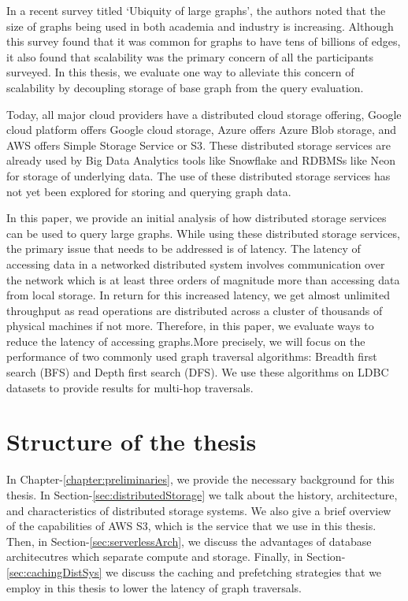 In a recent survey titled `Ubiquity of large graphs'\cite{sahu2017ubiquity}, the
authors noted that the size of graphs being used in both academia and industry
is increasing. Although this survey found that it was common for graphs to have
tens of billions of edges, it also found that scalability was the primary
concern of all the participants surveyed\cite{sahu2017ubiquity}. In this thesis,
we evaluate one way to alleviate this concern of scalability by decoupling
storage of base graph from the query evaluation.

\medskip
Today, all major cloud providers have a distributed cloud storage offering,
Google cloud platform offers Google cloud storage\cite{gcpStorage}, Azure offers
Azure Blob storage\cite{azureStorage}, and AWS offers Simple Storage Service or 
S3\cite{awsS3}. These distributed storage services are already used by Big Data
Analytics tools like Snowflake\cite{snowflake} and RDBMSs like Neon\cite{neonPostgres} 
for storage of underlying data. The use of these distributed storage services has not
yet been explored for storing and querying graph data.

\medskip
In this paper, we provide an initial analysis of how distributed storage services can 
be used to query large graphs. While using these distributed storage services, the primary
issue that needs to be addressed is of latency. The latency of accessing data in a networked
distributed system involves communication over the network which is at least three orders of
magnitude more than accessing data from local storage. In return for this increased latency,
we get almost unlimited throughput as read operations are distributed across a cluster 
of thousands of physical machines if not more. Therefore, in this paper, we evaluate ways to
reduce the latency of accessing graphs.More precisely, we will focus on the 
performance of two commonly used graph traversal algorithms: Breadth first search 
(BFS) and Depth first search (DFS). We use these algorithms on LDBC datasets
to provide results for multi-hop traversals. 

\section{Structure of the thesis}

\medskip
In Chapter-\ref{chapter:preliminaries}, we provide the necessary background for
this thesis. In Section-\ref{sec:distributedStorage} we talk about the
history, architecture, and characteristics of distributed storage systems. We
also give a brief overview of the capabilities of AWS S3, which is the service
that we use in this thesis. Then,
in Section-\ref{sec:serverlessArch}, we discuss the advantages of database
architecutres which separate compute and storage. Finally, in
Section-\ref{sec:cachingDistSys} we discuss the caching and prefetching
strategies that we employ in this thesis to lower the latency of graph
traversals.

